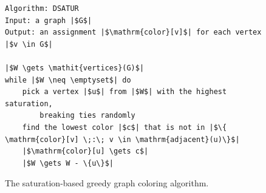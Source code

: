 \documentclass[11pt]{book}
\begin{document}
\begin{figure}[btp]
  \centering
\begin{lstlisting}[basicstyle=\rmfamily,deletekeywords={for,from,with,is,not,in,find},morekeywords={while},columns=fullflexible]
Algorithm: DSATUR
Input: a graph |$G$|
Output: an assignment |$\mathrm{color}[v]$| for each vertex |$v \in G$|

|$W \gets \mathit{vertices}(G)$|
while |$W \neq \emptyset$| do
    pick a vertex |$u$| from |$W$| with the highest saturation,
        breaking ties randomly
    find the lowest color |$c$| that is not in |$\{ \mathrm{color}[v] \;:\; v \in \mathrm{adjacent}(u)\}$|
    |$\mathrm{color}[u] \gets c$|
    |$W \gets W - \{u\}$|
\end{lstlisting}
  \caption{The saturation-based greedy graph coloring algorithm.}
  \label{fig:satur-algo}
\end{figure}
\end{document}
